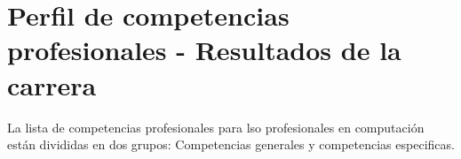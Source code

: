 \section{Perfil de competencias profesionales - Resultados de la carrera}\label{sec:competencies}
La lista de competencias profesionales para lso profesionales en computación están divididas en dos grupos: Competencias generales y competencias especificas.




% 
